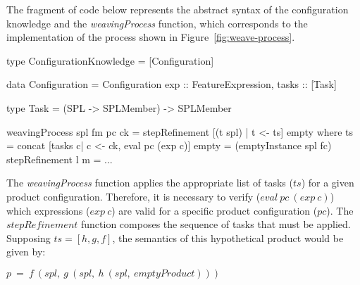 \appendix

The fragment of code below represents the abstract syntax of the 
configuration knowledge and the \emph{weavingProcess} function, which 
corresponds to the implementation of the process shown in Figure~\ref{fig:weave-process}.
 
 \begin{code}
 type ConfigurationKnowledge = [Configuration]

 data Configuration = Configuration {
  exp :: FeatureExpression,
  tasks :: [Task] 	
 }

 type Task = (SPL -> SPLMember) -> SPLMember

 weavingProcess spl fm pc ck =
    stepRefinement [(t spl) | t <- ts] empty where
     ts = concat [tasks c| c <- ck, eval pc (exp c)] 
     empty = (emptyInstance spl
     fc)
    stepRefinement l m = ...
 \end{code}
 
 The \emph{weavingProcess} function applies the appropriate list of tasks ($ts$)
 for a given product configuration. Therefore, it is necessary to verify  ($eval\
 pc\ (exp\ c)$) which expressions ($exp\ c$) are valid for a specific product
 configuration ($pc$). The $stepRefinement$ function composes the sequence of
 tasks that must be applied. Supposing $ts = [h,g,f]$, the semantics of this
 hypothetical product would be given by:

 \begin{center}
 $ p\ =\ f\ (spl,\ g\ (spl,\ h\ (spl,\ emptyProduct)))  $
 \end{center}